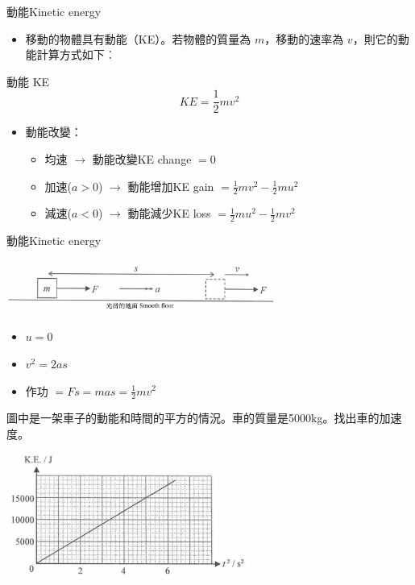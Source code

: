 \documentclass[beamer=true]{standalone}
\begin{document}
\begin{frame}{動能Kinetic energy}
    \begin{itemize}
        \item 移動的物體具有動能（KE）。若物體的質量為 $m$，移動的速率為 $v$，則它的動能計算方式如下︰
    \end{itemize}
    \begin{alertblock}
        {動能 KE}
        \begin{equation}
            KE=\frac{1}{2}mv^2
        \end{equation}
    \end{alertblock}
    \begin{itemize}
        \item 動能改變：
              \begin{itemize}
                  \item 均速 $\rightarrow$ 動能改變KE change  $=0$
                  \item 加速($a>0$) $\rightarrow$ 動能增加KE gain $=\frac{1}{2}mv^2-\frac{1}{2}mu^2$
                  \item 減速($a<0$) $\rightarrow$ 動能減少KE loss $=\frac{1}{2}mu^2-\frac{1}{2}mv^2$
              \end{itemize}
    \end{itemize}
\end{frame}


\begin{frame}{動能Kinetic energy}
    \par
    {\par\centering
        \includegraphics[width=0.66\textwidth]{assets/7304acb1.png}
        \par}
    \begin{itemize}
        \item[] $u=0$
        \item[] $v^2=2as$
        \item[] 作功 $=Fs=mas=\frac{1}{2}mv^2$
    \end{itemize}
\end{frame}

\begin{eg}
    圖中是一架車子的動能和時間的平方的情況。車的質量是5000kg。找出車的加速度。
    {\par\raggedleft
    \includegraphics[width=0.6\textwidth]{assets/3643740d.png}
    \par}
\end{eg}
\end{document}

